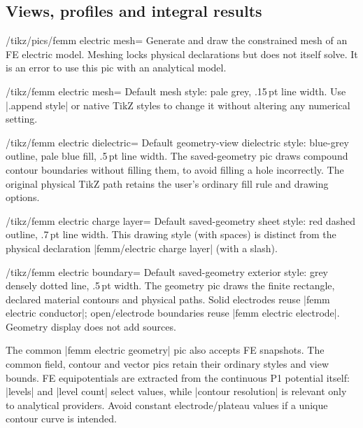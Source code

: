 \subsection{Views, profiles and integral results}
\label{sec:electric-fe-views}
\begin{key}{/tikz/pics/femm electric mesh=}
Generate and draw the constrained mesh of an FE electric model. Meshing locks
physical declarations but does not itself solve. It is an error to use this
pic with an analytical model.
\end{key}
\begin{key}{/tikz/femm electric mesh=}
Default mesh style: pale grey, .15\,pt line width. Use |.append style| or native
TikZ styles to change it without altering any numerical setting.
\end{key}
\begin{key}{/tikz/femm electric dielectric=}
Default geometry-view dielectric style: blue-grey outline, pale blue fill,
.5\,pt line width. The saved-geometry pic draws compound contour boundaries
without filling them, to avoid filling a hole incorrectly. The original physical
TikZ path retains the user's ordinary fill rule and drawing options.
\end{key}
\begin{key}{/tikz/femm electric charge layer=}
Default saved-geometry sheet style: red dashed outline, .7\,pt line width.
This drawing style (with spaces) is distinct from the physical declaration
|femm/electric charge layer| (with a slash).
\end{key}
\begin{key}{/tikz/femm electric boundary=}
Default saved-geometry exterior style: grey densely dotted line, .5\,pt width.
The geometry pic draws the finite rectangle, declared material contours and
physical paths. Solid electrodes reuse |femm electric conductor|; open/electrode
boundaries reuse |femm electric electrode|. Geometry display does not add sources.
\end{key}

The common |femm electric geometry| pic also accepts FE snapshots. The common
field, contour and vector pics retain their ordinary styles and view bounds.
FE equipotentials are extracted from the continuous P1 potential itself:
|levels| and |level count| select values, while |contour resolution| is relevant
only to analytical providers. Avoid constant electrode/plateau values if a
unique contour curve is intended.

